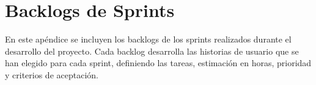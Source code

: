 \chapter{Backlogs de Sprints}
\label{chap:sprints_backlogs}
En este apéndice se incluyen los backlogs de los sprints realizados durante el desarrollo del proyecto. Cada backlog desarrolla las historias de usuario que se han elegido para cada sprint, definiendo las tareas, estimación en horas, prioridad y criterios de aceptación.



